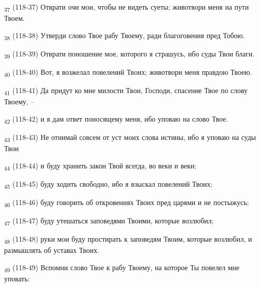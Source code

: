 \begin{tcolorbox}
\textsubscript{37} (118-37) Отврати очи мои, чтобы не видеть суеты; животвори меня на пути Твоем.
\end{tcolorbox}
\begin{tcolorbox}
\textsubscript{38} (118-38) Утверди слово Твое рабу Твоему, ради благоговения пред Тобою.
\end{tcolorbox}
\begin{tcolorbox}
\textsubscript{39} (118-39) Отврати поношение мое, которого я страшусь, ибо суды Твои благи.
\end{tcolorbox}
\begin{tcolorbox}
\textsubscript{40} (118-40) Вот, я возжелал повелений Твоих; животвори меня правдою Твоею.
\end{tcolorbox}
\begin{tcolorbox}
\textsubscript{41} (118-41) Да придут ко мне милости Твои, Господи, спасение Твое по слову Твоему, --
\end{tcolorbox}
\begin{tcolorbox}
\textsubscript{42} (118-42) и я дам ответ поносящему меня, ибо уповаю на слово Твое.
\end{tcolorbox}
\begin{tcolorbox}
\textsubscript{43} (118-43) Не отнимай совсем от уст моих слова истины, ибо я уповаю на суды Твои
\end{tcolorbox}
\begin{tcolorbox}
\textsubscript{44} (118-44) и буду хранить закон Твой всегда, во веки и веки;
\end{tcolorbox}
\begin{tcolorbox}
\textsubscript{45} (118-45) буду ходить свободно, ибо я взыскал повелений Твоих;
\end{tcolorbox}
\begin{tcolorbox}
\textsubscript{46} (118-46) буду говорить об откровениях Твоих пред царями и не постыжусь;
\end{tcolorbox}
\begin{tcolorbox}
\textsubscript{47} (118-47) буду утешаться заповедями Твоими, которые возлюбил;
\end{tcolorbox}
\begin{tcolorbox}
\textsubscript{48} (118-48) руки мои буду простирать к заповедям Твоим, которые возлюбил, и размышлять об уставах Твоих.
\end{tcolorbox}
\begin{tcolorbox}
\textsubscript{49} (118-49) Вспомни слово Твое к рабу Твоему, на которое Ты повелел мне уповать:
\end{tcolorbox}
